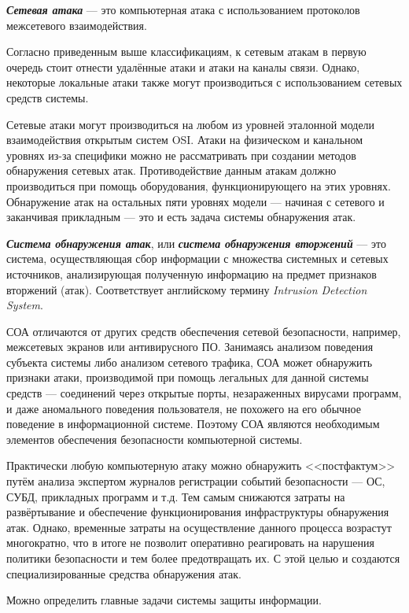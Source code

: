 \textit{\textbf{Сетевая атака}} --- это компьютерная атака с использованием протоколов межсетевого взаимодействия.

Согласно приведенным выше классификациям, к сетевым атакам в первую очередь стоит отнести удалённые атаки и атаки на каналы связи. Однако, некоторые локальные атаки также могут производиться с использованием сетевых средств системы.

Сетевые атаки могут производиться на любом из уровней эталонной модели взаимодействия открытым систем OSI. Атаки на физическом и канальном уровнях из-за специфики можно не рассматривать при создании методов обнаружения сетевых атак. Противодействие данным атакам должно производиться при помощь оборудования, функционирующего на этих уровнях. Обнаружение атак на остальных пяти уровнях модели --- начиная с сетевого и заканчивая прикладным --- это и есть задача системы обнаружения атак.

\textit{\textbf{Система обнаружения атак}}, или \textit{\textbf{система обнаружения вторжений}} --- это система, осуществляющая сбор информации с множества системных и сетевых источников, анализирующая полученную информацию на предмет признаков вторжений (атак). Соответствует английскому термину \textit{Intrusion Detection System}.

СОА отличаются от других средств обеспечения сетевой безопасности, например, межсетевых экранов или антивирусного ПО. Занимаясь анализом поведения субъекта системы либо анализом сетевого трафика, СОА может обнаружить признаки атаки, производимой при помощь легальных для данной системы средств --- соединений через открытые порты, незараженных вирусами программ, и даже аномального поведения пользователя, не похожего на его обычное поведение в информационной системе. Поэтому СОА являются необходимым элементов обеспечения безопасности компьютерной системы.

Практически любую компьютерную атаку можно обнаружить <<постфактум>> путём анализа экспертом журналов регистрации событий безопасности --- ОС, СУБД, прикладных программ и т.д. Тем самым снижаются затраты на развёртывание и обеспечение функционирования инфраструктуры обнаружения атак. Однако, временные затраты на осуществление данного процесса возрастут многократно, что в итоге не позволит оперативно реагировать на нарушения политики безопасности и тем более предотвращать их. С этой целью и создаются специализированные средства обнаружения атак.

Можно определить главные задачи системы защиты информации.

